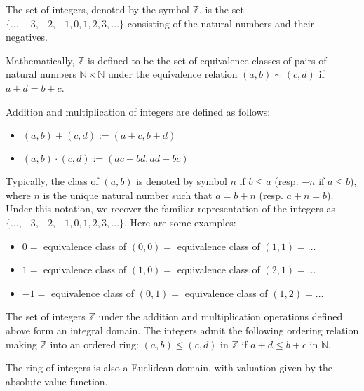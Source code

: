 \documentclass[12pt]{article}
\begin{document}
The set of integers, denoted by the symbol $\mathbb{Z}$, is the set $\{\dots -3, -2, -1, 0, 1, 2, 3, \dots\}$ consisting of the natural numbers and their negatives.

Mathematically, $\mathbb{Z}$ is defined to be the set of equivalence classes of pairs of natural numbers $\mathbb{N} \times \mathbb{N}$ under the equivalence relation $(a,b) \sim (c,d)$ if $a+d = b+c$.

Addition and multiplication of integers are defined as follows:
\begin{itemize}
\item $(a,b)+(c,d) := (a+c,b+d)$
\item $(a,b)\cdot(c,d) := (ac+bd,ad+bc)$
\end{itemize}
Typically, the class of $(a,b)$ is denoted by symbol $n$ if $b \leq a$ (resp. $-n$ if $a \leq b$), where $n$ is the unique natural number such that $a=b+n$ (resp. $a+n=b$). Under this notation, we recover the familiar representation of the integers as $\{\dots, -3, -2, -1, 0, 1, 2, 3, \dots\}$. Here are some examples:
\begin{itemize}
\item $0 = $ equivalence class of $(0,0) = $ equivalence class of $(1,1) = \dots$
\item $1 = $ equivalence class of $(1,0) = $ equivalence class of $(2,1) = \dots$
\item $-1 = $ equivalence class of $(0,1) = $ equivalence class of $(1,2) = \dots$
\end{itemize}
The set of integers $\mathbb{Z}$ under the addition and multiplication operations defined above form an integral domain. The integers admit the following ordering relation making $\mathbb{Z}$ into an ordered ring: $(a,b) \leq (c,d)$ in $\mathbb{Z}$ if $a+d \leq b+c$ in $\mathbb{N}$.

The ring of integers is also a Euclidean domain, with valuation given by the absolute value function.
\end{document}
